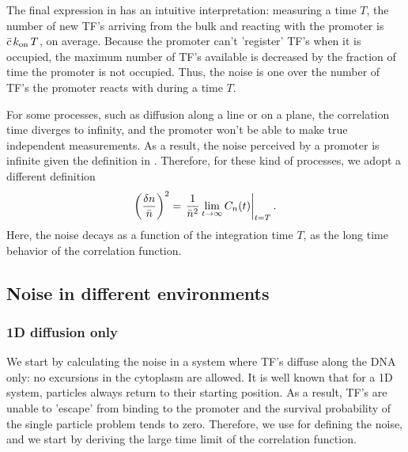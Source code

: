 The final expression in  has an intuitive interpretation: measuring a time $T$, the number of new TF's arriving from the bulk and reacting with the promoter is $\bar{c}\,k_{\rm on}\,T$, on average.  Because the promoter can't 'register' TF's when it is occupied, the maximum number of TF's available is decreased by the fraction of time the promoter is not occupied. Thus, the noise is one over the number of TF's the promoter reacts with during a time $T$.

For some processes, such as diffusion along a line or on a plane, the correlation time diverges to infinity, and the promoter won't be able to make true independent measurements. As a result, the noise perceived by a promoter is infinite given the definition in . Therefore, for these kind of processes, we adopt a different definition
\begin{equation}
  \left( \frac{\delta n}{\bar{n}} \right)^2 = \left. \frac{1}{\bar{n}^2} \lim_{t \to \infty} C_n(t)  \right|_{t = T}.
  \elabel{EqProNoiseII}
\end{equation}
Here, the noise decays as a function of the integration time $T$, as the long time behavior of the correlation function.


\subsection{Noise in different environments}

\subsubsection{1D diffusion only}
We start by calculating the noise in a system where TF's diffuse along the DNA only: no excursions in the cytoplasm are allowed. It is well known \cite{Redner2001} that for a 1D system, particles always return to their starting position. As a result, TF's are unable to 'escape' from binding to the promoter and the survival probability of the single particle problem tends to zero. Therefore, we use  for defining the noise, and we start by deriving the large time limit of the correlation function.

